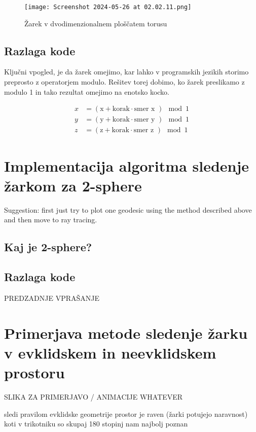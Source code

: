 \documentclass[titlepage]{article}
\begin{document}
\begin{figure}[H]
    \centering
    \texttt{[image: Screenshot 2024-05-26 at 02.02.11.png]}
    \caption{Žarek v dvodimenzionalnem ploščatem torusu}
    \label{fig:enter-label}
\end{figure}



\subsection{Razlaga kode}

Ključni vpogled, je da žarek omejimo, kar lahko v programskih jezikih storimo preprosto z operatorjem modulo. Rešitev torej dobimo, ko žarek preslikamo z modulo 1 in tako rezultat omejimo na enotsko kocko.
        
\begin{align*}
x &= \left( \text{x} + \text{korak} \cdot \text{smer x }\right) \mod 1 \\
y &= \left( \text{y} + \text{korak} \cdot \text{smer y }\right) \mod 1 \\
z &= \left( \text{z} + \text{korak} \cdot \text{smer z }\right) \mod 1
\end{align*}

\section{Implementacija algoritma sledenje žarkom za 2-sphere}
Suggestion: first just try to plot one geodesic
using the method described above and then move to ray tracing.

\subsection{Kaj je 2-sphere?}

\subsection{Razlaga kode}
PREDZADNJE VPRAŠANJE 

\section {Primerjava metode sledenje žarku v evklidskem in neevklidskem prostoru}

SLIKA ZA PRIMERJAVO / ANIMACIJE WHATEVER


sledi pravilom evklidske geometrije
prostor je raven (žarki potujejo naravnost)
koti v trikotniku so skupaj 180 stopinj
nam najbolj poznan
\end{document}
